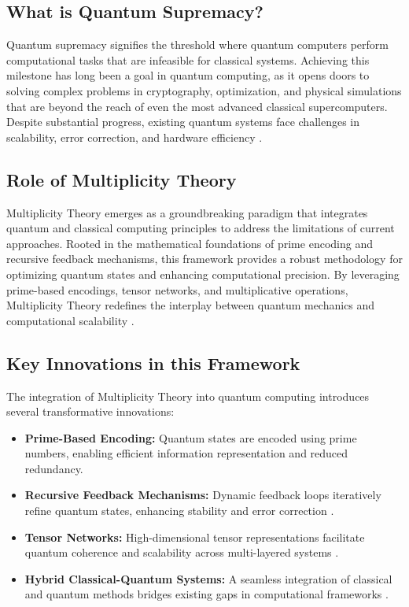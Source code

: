 \documentclass{article}
\theoremstyle{plain}
\begin{document}
\subsection{What is Quantum Supremacy?}
Quantum supremacy signifies the threshold where quantum computers perform computational tasks that are infeasible for classical systems. Achieving this milestone has long been a goal in quantum computing, as it opens doors to solving complex problems in cryptography, optimization, and physical simulations that are beyond the reach of even the most advanced classical supercomputers. Despite substantial progress, existing quantum systems face challenges in scalability, error correction, and hardware efficiency \cite{arute2019quantum, preskill2018quantum}.

\subsection{Role of Multiplicity Theory}
Multiplicity Theory emerges as a groundbreaking paradigm that integrates quantum and classical computing principles to address the limitations of current approaches. Rooted in the mathematical foundations of prime encoding and recursive feedback mechanisms, this framework provides a robust methodology for optimizing quantum states and enhancing computational precision. By leveraging prime-based encodings, tensor networks, and multiplicative operations, Multiplicity Theory redefines the interplay between quantum mechanics and computational scalability \cite{ wolfram2020hypergraph}.

\subsection{Key Innovations in this Framework}
The integration of Multiplicity Theory into quantum computing introduces several transformative innovations:
\begin{itemize}
    \item \textbf{Prime-Based Encoding:} Quantum states are encoded using prime numbers, enabling efficient information representation and reduced redundancy.
    \item \textbf{Recursive Feedback Mechanisms:} Dynamic feedback loops iteratively refine quantum states, enhancing stability and error correction \cite{wolfram2020feedback}.
    \item \textbf{Tensor Networks:} High-dimensional tensor representations facilitate quantum coherence and scalability across multi-layered systems \cite{biamonte2017tensor}.
    \item \textbf{Hybrid Classical-Quantum Systems:} A seamless integration of classical and quantum methods bridges existing gaps in computational frameworks \cite{preskill2018quantum}.
\end{itemize}
\end{document}
